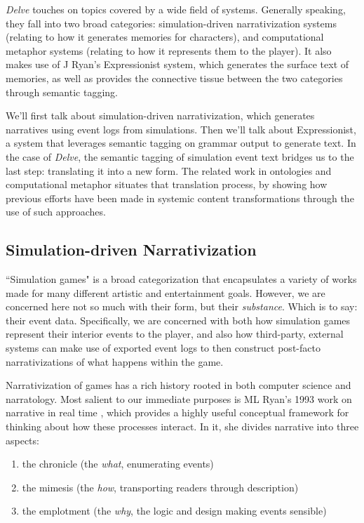 \textit{Delve} touches on topics covered by a wide field of systems. Generally speaking, they fall into two broad categories: simulation-driven narrativization systems (relating to how it generates memories for characters), and computational metaphor systems (relating to how it represents them to the player). It also makes use of J Ryan's Expressionist system, which generates the surface text of memories, as well as provides the connective tissue between the two categories through semantic tagging.

We'll first talk about simulation-driven narrativization, which generates narratives using event logs from simulations. Then we'll talk about Expressionist, a system that leverages semantic tagging on grammar output to generate text. In the case of \textit{Delve}, the semantic tagging of simulation event text bridges us to the last step: translating it into a new form. The related work in ontologies and computational metaphor situates that translation process, by showing how previous efforts have been made in systemic content transformations through the use of such approaches.

\subsection{Simulation-driven Narrativization}
\label{subsec:simulation-driven-narrativization}

``Simulation games" is a broad categorization that encapsulates a variety of works made for many different artistic and entertainment goals. However, we are concerned here not so much with their form, but their \textit{substance}. Which is to say: their event data. Specifically, we are concerned with both how simulation games represent their interior events to the player, and also how third-party, external systems can make use of exported event logs to then construct post-facto narrativizations of what happens within the game.

Narrativization of games has a rich history rooted in both computer science and narratology. Most salient to our immediate purposes is ML Ryan's 1993 work on narrative in real time \cite{mimesis_baseball},  which provides a highly useful conceptual framework for thinking about how these processes interact. In it, she divides narrative into three aspects:

\begin{enumerate}
    \item the chronicle (the \textit{what}, enumerating events)
    \item the mimesis (the \textit{how}, transporting readers through description)
    \item the emplotment (the \textit{why}, the logic and design making events sensible)
\end{enumerate}

